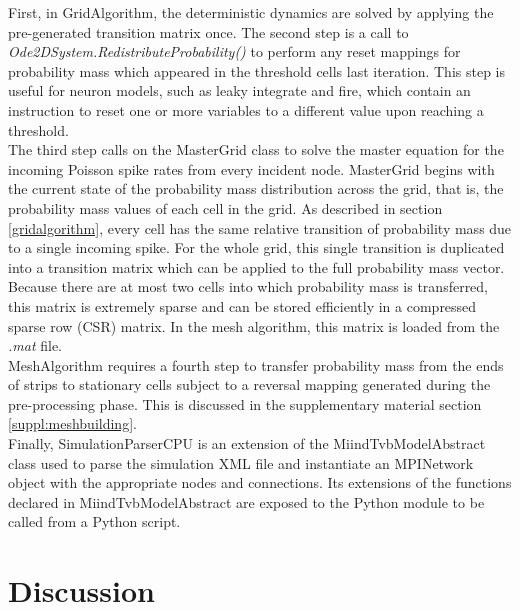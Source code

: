\documentclass[utf8]{frontiersSCNS} %
\begin{document}
First, in GridAlgorithm, the deterministic dynamics are solved by applying the pre-generated transition matrix once. The second step is a call to \textit{Ode2DSystem.RedistributeProbability()} to perform any reset mappings for probability mass which appeared in the threshold cells last iteration. This step is useful for neuron models, such as leaky integrate and fire, which contain an instruction to reset one or more variables to a different value upon reaching a threshold.\\

The third step calls on the MasterGrid class to solve the master equation for the incoming Poisson spike rates from every incident node. MasterGrid begins with the current state of the probability mass distribution across the grid, that is, the probability mass values of each cell in the grid. As described in section \ref{gridalgorithm}, every cell has the same relative transition of probability mass due to a single incoming spike. For the whole grid, this single transition is duplicated into a transition matrix which can be applied to the full probability mass vector. Because there are at most two cells into which probability mass is transferred, this matrix is extremely sparse and can be stored efficiently in a compressed sparse row (CSR) matrix. In the mesh algorithm, this matrix is loaded from the \textit{.mat} file.\\

MeshAlgorithm requires a fourth step to transfer probability mass from the ends of strips to stationary cells subject to a reversal mapping generated during the pre-processing phase. This is discussed in the supplementary material section \ref{suppl:meshbuilding}.\\

Finally, SimulationParserCPU is an extension of the MiindTvbModelAbstract class used to parse the simulation XML file and instantiate an MPINetwork object with the appropriate nodes and connections. Its extensions of the functions declared in MiindTvbModelAbstract are exposed to the Python module to be called from a Python script. 

\section{Discussion}
\end{document}
